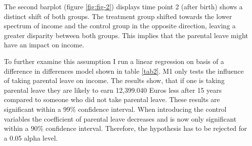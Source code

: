 \documentclass[
  11pt,
]{article}
\begin{document}
The second barplot (figure \ref{fig:fig-2}) displays time point 2 (after birth) shows a distinct shift of both groups. The treatment group shifted towards the lower spectrum of income and the control group in the opposite direction, leaving a greater disparity between both groups. This implies that the parental leave might have an impact on income.

To further examine this assumption I run a linear regression on basis of a difference in differences model shown in table \ref{tab2}. M1 only tests the influence of taking parental leave on income. The results show, that if one is taking parental leave they are likely to earn 12,399.040 Euros less after 15 years compared to someone who did not take parental leave. These results are significant within a 99\% confidence interval. When introducing the control variables the coefficient of parental leave decreases and is now only significant within a 90\% confidence interval. Therefore, the hypothesis has to be rejected for a 0.05 alpha level.
\end{document}
